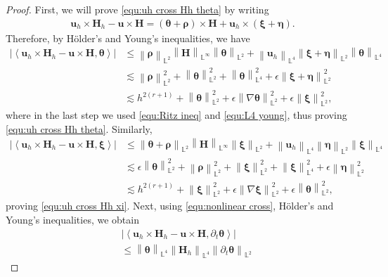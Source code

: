 \documentclass[11pt, reqno]{amsart}
\theoremstyle{definition}
\theoremstyle{remark}
\numberwithin{equation}{section}
\newcommand{\bff}{\boldsymbol}
\newcommand{\bb}{\mathbb}
\newcommand{\norm}[2]{\left\|{#1}\right\|_{#2}}
\newcommand{\inpro}[2]{\left\langle#1,#2\right\rangle}
\begin{document}
\begin{proof}
First, we will prove \eqref{equ:uh cross Hh theta} by writing
\begin{align}\label{equ:cross split}
	\bff{u}_h \times \bff{H}_h - \bff{u} \times \bff{H}
	=
	(\bff{\theta}+\bff{\rho}) \times \bff{H}
	+
	\bff{u}_h \times (\bff{\xi}+\bff{\eta}).
\end{align}
Therefore, by H\"older's and Young's inequalities, we have
\begin{align*}
	\big| \inpro{\bff{u}_h \times \bff{H}_h- \bff{u} \times \bff{H}}{\bff{\theta}} \big| 
	&\leq
	\norm{\bff{\rho}}{\bb{L}^2} \norm{\bff{H}}{\bb{L}^\infty} \norm{\bff{\theta}}{\bb{L}^2}
	+
	\norm{\bff{u}_h}{\bb{L}^4} \norm{\bff{\xi}+\bff{\eta}}{\bb{L}^2} \norm{\bff{\theta}}{\bb{L}^4}
	\\
	&\lesssim
	\norm{\bff{\rho}}{\bb{L}^2}^2
	+
	\norm{\bff{\theta}}{\bb{L}^2}^2
	+
	\norm{\bff{\theta}}{\bb{L}^4}^2
	+
	\epsilon \norm{\bff{\xi}+\bff{\eta}}{\bb{L}^2}^2
	\\
	&\lesssim
	h^{2(r+1)} 
	+
	\norm{\bff{\theta}}{\bb{L}^2}^2
	+
	\epsilon \norm{\nabla \bff{\theta}}{\bb{L}^2}^2
	+
	\epsilon \norm{\bff{\xi}}{\bb{L}^2}^2,
\end{align*}
where in the last step we used \eqref{equ:Ritz ineq} and \eqref{equ:L4 young}, thus proving \eqref{equ:uh cross Hh theta}.
Similarly,
\begin{align*}
	\big| \inpro{\bff{u}_h \times \bff{H}_h- \bff{u} \times \bff{H}}{\bff{\xi}} \big| 
	&\leq
	\norm{\bff{\theta}+\bff{\rho}}{\bb{L}^2} \norm{\bff{H}}{\bb{L}^\infty} \norm{\bff{\xi}}{\bb{L}^2}
	+
	\norm{\bff{u}_h}{\bb{L}^4} \norm{\bff{\eta}}{\bb{L}^2} \norm{\bff{\xi}}{\bb{L}^4}
	\\
	&\lesssim
	\epsilon \norm{\bff{\theta}}{\bb{L}^2}^2
	+
	\norm{\bff{\rho}}{\bb{L}^2}^2
	+
	\norm{\bff{\xi}}{\bb{L}^2}^2
	+
	\norm{\bff{\xi}}{\bb{L}^4}^2
	+
	\epsilon \norm{\bff{\eta}}{\bb{L}^2}^2
	\\
	&\lesssim
	h^{2(r+1)}
	+
	\norm{\bff{\xi}}{\bb{L}^2}^2
	+
	\epsilon \norm{\nabla \bff{\xi}}{\bb{L}^2}^2
	+
	\epsilon \norm{\bff{\theta}}{\bb{L}^2}^2,
\end{align*}
proving \eqref{equ:uh cross Hh xi}.
Next, using \eqref{equ:nonlinear cross}, H\"older's and Young's inequalities, we obtain
\begin{align*}
	&\big| \inpro{\bff{u}_h \times \bff{H}_h- \bff{u} \times \bff{H}}{\partial_t \bff{\theta}} \big| 
	\\
	&\leq
	\norm{\bff{\theta}}{\bb{L}^4}
	\norm{\bff{H}_h}{\bb{L}^4}
	\norm{\partial_t \bff{\theta}}{\bb{L}^2}

\end{align*}
\end{proof}
\end{document}
